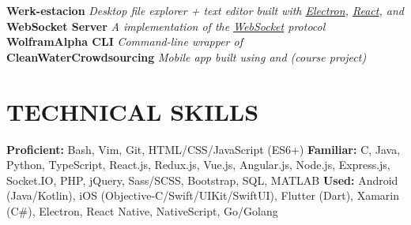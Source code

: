 \documentclass[11pt]{article}
\begin{document}
\vspace{0.5em}
%
\textbf{Werk-estacion} \enspace \textit{Desktop file explorer + text editor built with \underline{Electron}, \underline{React}, and \underline{}}\\
\textbf{WebSocket Server}  \enspace \textit{A \underline{} implementation of  the \underline{WebSocket} protocol}\\
\textbf{WolframAlpha CLI} \enspace \textit{Command-line wrapper of \underline{}}\\
\textbf{CleanWaterCrowdsourcing} \enspace \textit{Mobile app built using \underline{} and \underline{} (course project)}
\section*{TECHNICAL SKILLS}
\textbf{Proficient:} Bash, Vim, Git, HTML/CSS/JavaScript (ES6+) \enspace\textbf{Familiar:} C, Java, Python, TypeScript, React.js, Redux.js, Vue.js, Angular.js, Node.js, Express.js, Socket.IO, PHP, jQuery, Sass/SCSS, Bootstrap, SQL, MATLAB \enspace\textbf{Used:}  Android (Java/Kotlin), iOS (Objective-C/Swift/UIKit/SwiftUI), Flutter (Dart), Xamarin (C\#), Electron, React Native, NativeScript, Go/Golang
\end{document}
